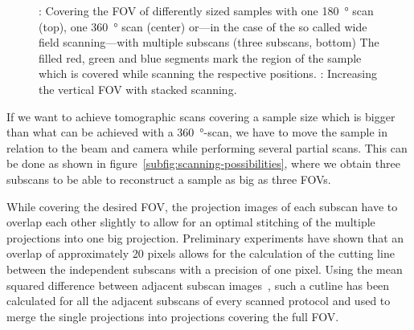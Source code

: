 \begin{figure}[htp]
	\noindent{}%
	\caption[Covering the FOV of differently sized samples]{: Covering the FOV of differently sized samples with one \SI{180}{\degree} scan (top), one \SI{360}{\degree} scan (center) or---in the case of the so called wide field scanning---with multiple subscans (three subscans, bottom) The filled red, green and blue segments mark the region of the sample which is covered while scanning the respective positions. : Increasing the vertical FOV with stacked scanning.
	}%
	\label{fig:scanning-possibilities}%
\end{figure}

If we want to achieve tomographic scans covering a sample size which is bigger than what can be achieved with a \SI{360}{\degree}-scan, we have to move the sample in relation to the beam and camera while performing several partial scans. This can be done as shown in figure~\ref{subfig:scanning-possibilities}, where we obtain three subscans to be able to reconstruct a sample as big as three FOVs.

\cbstart
While covering the desired FOV, the projection images of each subscan have to overlap each other slightly to allow for an optimal stitching of the multiple projections into one big projection. Preliminary experiments have shown that an overlap of approximately 20 pixels allows for the calculation of the cutting line between the independent subscans with a precision of one pixel. Using the mean squared difference between adjacent subscan images~\citet{Hintermueller2009}, such a cutline has been calculated for all the adjacent subscans of every scanned protocol and used to merge the single projections into projections covering the full FOV.
\cbend


